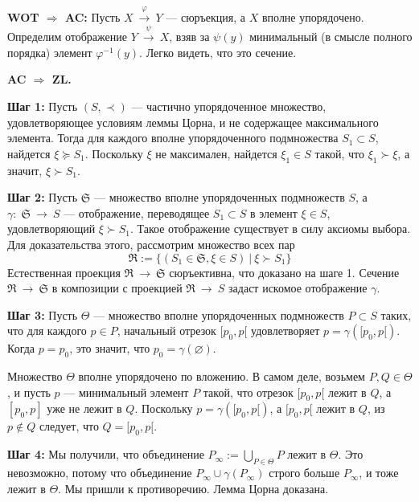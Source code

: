 \documentclass[12pt]{book}
\newcommand{\arrow}{{\:\longrightarrow\:}}
\def\endproof{\hbox{\vrule width 5pt height 5pt depth 0pt}}
\renewcommand{\phi}{\varphi}
\renewcommand{\emptyset}{\varnothing}
\theoremstyle{upshape}
\theoremstyle{generic}
\theoremstyle{upshapenonumber}
\newcommand{\следствие}{%
     \refstepcounter{teorema}
     {\noindent\bf Следствие \thechapter.\arabic{teorema}:\ }}
\newcommand{\пример}{%
     \refstepcounter{teorema}
     {\noindent\bf Пример \thechapter.\arabic{teorema}:\ }}
\newcommand{\лемма}{%
     \refstepcounter{teorema}
     {\noindent\bf Лемма \thechapter.\arabic{teorema}:\ }}
\newcommand{\теорема}{%
     \refstepcounter{teorema}
     {\noindent\bf Теорема \thechapter.\arabic{teorema}:\ }}
\newcommand{\утверждение}{%
     \refstepcounter{teorema}
     {\noindent\bf Утверждение \thechapter.\arabic{teorema}:\ }}
\def\хфилл{\hfill}
\def\ноиндент{\noindent}
\def\бф{\bf}
\def\goth{\mathfrak}
\begin{document}
\хфилл

\ноиндент
{\бф WOT $\Rightarrow$ AC:}
Пусть $X\stackrel\phi \arrow Y$ --- сюръекция, а $X$ вполне
упорядочено. Определим отображение $Y \stackrel\psi\arrow X$,
взяв за $\psi(y)$ минимальный (в смысле полного порядка)
элемент $\phi^{-1}(y)$. Легко видеть, что это сечение.

\хфилл

\ноиндент
{\бф AC $\Rightarrow$ ZL.} 

\хфилл

\ноиндент
{\bf  Шаг 1:}
Пусть $(S, \prec)$ --- частично упорядоченное множество,
удовлетворяющее условиям леммы Цорна, и не содержащее
максимального элемента. Тогда для каждого вполне
упорядоченного подмножества $S_1\subset S$, 
найдется $\xi \succcurlyeq S_1$. Поскольку $\xi$
не максимален, найдется $\xi_1\in S$ такой, что
$\xi_1 \succ \xi$, а значит, $\xi \succ S_1$.

\хфилл

\ноиндент
{\bf  Шаг 2:}
Пусть ${\goth S}$ --- множество
вполне упорядоченных подмножеств $S$,
а $\gamma:\; {\goth S}\arrow S$ --- отображение,
переводящее $S_1 \subset S$ в элемент $\xi\in S$,
удовлетворяющий $\xi \succ S_1$. 
Такое отображение существует в силу аксиомы выбора.
Для доказательства этого, рассмотрим множество
всех пар 
\[ {\goth R}:= \{ (S_1 \in {\goth S}, \xi \in S) \ | \  \xi \succ S_1\}
\]
Естественная проекция ${\goth R}\arrow {\goth S}$
сюръективна, что доказано на шаге 1. Сечение
${\goth R}\arrow {\goth S}$ в композиции с проекцией
${\goth R}\arrow S$ задаст искомое отображение $\gamma$.



\хфилл

\ноиндент
{\bf  Шаг 3:}
Пусть $\Theta$ --- множество вполне упорядоченных
подмножеств $P\subset S$ таких, что
для каждого $p\in P$, начальный отрезок
$[p_0, p[$ удовлетворяет $p = \gamma([p_0, p[)$.
Когда $p=p_0$, это значит, что
$p_0=\gamma(\emptyset)$.

Множество $\Theta$ вполне упорядочено по вложению.
В самом деле, возьмем $P, Q\in \Theta$,
и пусть $p$ --- минимальный элемент $P$
такой, что отрезок $[p_0,p[$ лежит в $Q$,
а $[p_0,p]$ уже не лежит в $Q$.
Поскольку $p=\gamma([p_0,p[)$, а
$[p_0,p[$ лежит в $Q$, из $p\notin Q$ следует,
что $Q=[p_0,p[$.

\хфилл

\ноиндент
{\bf  Шаг 4:}
Мы получили, что объединение
$P_\infty:=\bigcup_{P\in\Theta} P$ лежит в $\Theta$.
Это невозможно, потому что объединение
$P_\infty \cup \gamma(P_\infty)$ строго больше
$P_\infty$, и тоже лежит в $\Theta$.
Мы пришли к противоречию. Лемма Цорна доказана.
\endproof
\end{document}
